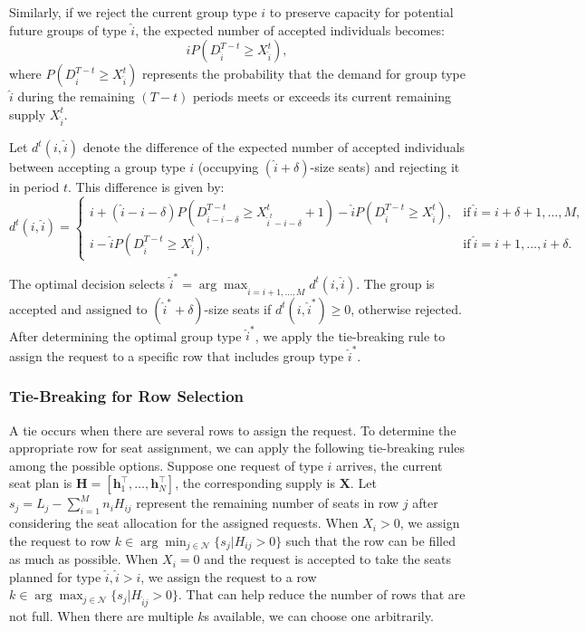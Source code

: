 Similarly, if we reject the current group type $i$ to preserve capacity for potential future groups of type $\hat{i}$, the expected number of accepted individuals becomes: $$\hat{i} P(D_{\hat{i}}^{T-t} \geq X_{\hat{i}}^{t}),$$ where $P(D_{\hat{i}}^{T-t} \geq X_{\hat{i}}^{t})$ represents the probability that the demand for group type $\hat{i}$ during the remaining $(T-t)$ periods meets or exceeds its current remaining supply $X_{\hat{i}}^{t}$.

Let $d^{t}({i},\hat{i})$ denote the difference of the expected number of accepted individuals between accepting a group type ${i}$ (occupying $(\hat{i}+\delta)$-size seats) and rejecting it in period $t$. This difference is given by:
\begin{equation*}
	d^{t}({i},\hat{i}) = \begin{cases}
    {i} + (\hat{i}-{i}-\delta)P(D_{\hat{i}-{i}-\delta}^{T-t} \geq X_{\hat{i}^{t}-{i}-\delta}^{t}+1) - \hat{i} P(D_{\hat{i}}^{T-t} \geq X_{\hat{i}}^{t}), &\text{if}~ \hat{i} = {i}+\delta+1, \ldots, M, \\
    {i} - \hat{i} P(D_{\hat{i}}^{T-t} \geq X_{\hat{i}}^{t}), &\text{if}~ \hat{i} = {i}+1, \ldots, {i}+\delta.
		\end{cases}
\end{equation*}

The optimal decision selects $\hat{i}^{*} = \arg \max_{\hat{i} = {i}+1, \ldots, M} d^{t}({i},\hat{i})$. The group is accepted and assigned to $(\hat{i}^{*} + \delta)$-size seats if $d^{t}({i},\hat{i}^{*}) \geq 0$, otherwise rejected. After determining the optimal group type $\hat{i}^{*}$, we apply the tie-breaking rule to assign the request to a specific row that includes group type $\hat{i}^{*}$.


\subsubsection*{Tie-Breaking for Row Selection}\label{tie-break}
A tie occurs when there are several rows to assign the request. To determine the appropriate row for seat assignment, we can apply the following tie-breaking rules among the possible options. Suppose one request of type ${i}$ arrives, the current seat plan is $\bm{H} = [\bm{h}_{1}^{\intercal}, \ldots, \bm{h}_{N}^{\intercal}]$, the corresponding supply is $\bm{X}$. Let $s_{j} = L_j - \sum_{i =1}^{M} n_{i} H_{ij}$ represent the remaining number of seats in row $j$ after considering the seat allocation for the assigned requests. When $X_{i} > 0$, we assign the request to row $k \in \arg \min_{j \in \mathcal{N}} \{s_{j}|H_{ij} > 0\}$ such that the row can be filled as much as possible. When $X_{i} = 0$ and the request is accepted to take the seats planned for type $\hat{i}, \hat{i}>i$, we assign the request to a row $k \in \arg \max_{j \in \mathcal{N}} \{s_{j}| H_{\hat{i} j}>0\}$. That can help reduce the number of rows that are not full. When there are multiple $k$s available, we can choose one arbitrarily. 

